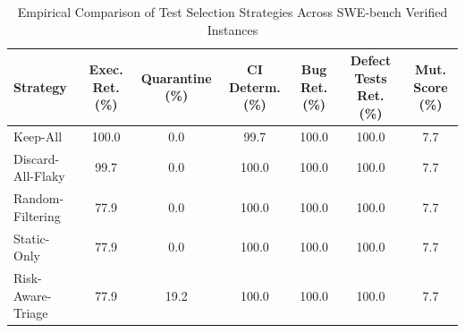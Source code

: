 \begin{table}[t]
\centering
\caption{Empirical Comparison of Test Selection Strategies Across SWE-bench Verified Instances}
\label{tab:strategy_comparison}
\begin{tabular}{lcccccc}
\toprule
\textbf{Strategy} & \textbf{Exec. Ret. (\%)} & \textbf{Quarantine (\%)} & \textbf{CI Determ. (\%)} & \textbf{Bug Ret. (\%)} & \textbf{Defect Tests Ret. (\%)} & \textbf{Mut. Score (\%)} \\
\midrule
Keep-All & 100.0 & 0.0 & 99.7 & 100.0 & 100.0 & 7.7 \\
Discard-All-Flaky & 99.7 & 0.0 & 100.0 & 100.0 & 100.0 & 7.7 \\
Random-Filtering & 77.9 & 0.0 & 100.0 & 100.0 & 100.0 & 7.7 \\
Static-Only & 77.9 & 0.0 & 100.0 & 100.0 & 100.0 & 7.7 \\
Risk-Aware-Triage & 77.9 & 19.2 & 100.0 & 100.0 & 100.0 & 7.7 \\
\bottomrule
\end{tabular}
\end{table}